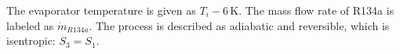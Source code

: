 The evaporator temperature is given as \( T_i - 6 \, \text{K} \).  
The mass flow rate of R134a is labeled as \( \dot{m}_{R134a} \).  
The process is described as adiabatic and reversible, which is isentropic: \( S_3 = S_1 \).